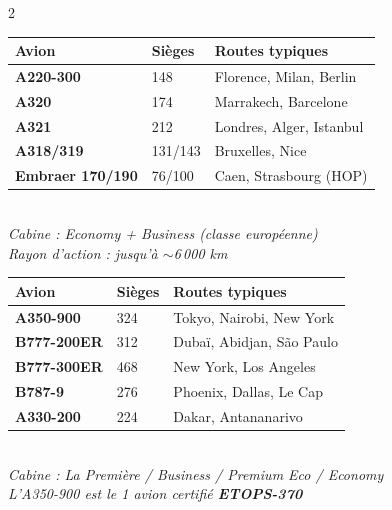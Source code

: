 \documentclass[9pt,a4paper,landscape]{article}
\begin{document}
\begin{multicols}{2}
\scriptsize

\begin{tcolorbox}[colback=eurlight,colframe=eurblue,title={\textbf{COURT \& MOYEN-COURRIER (Europe, Afrique N.)}},fonttitle=\bfseries\color{white}]
\begin{tabular}{lll}
\toprule
\textbf{Avion} & \textbf{Sièges} & \textbf{Routes typiques} \\
\midrule
\textbf{A220-300} & 148 & Florence, Milan, Berlin \\
\textbf{A320} & 174 & Marrakech, Barcelone \\
\textbf{A321} & 212 & Londres, Alger, Istanbul \\
\textbf{A318/319} & 131/143 & Bruxelles, Nice \\
\textbf{Embraer 170/190} & 76/100 & Caen, Strasbourg (HOP) \\
\bottomrule
\end{tabular}\\[0.1cm]
\textit{Cabine : Economy + Business (classe européenne)}\\
\textit{Rayon d'action : jusqu'à $\sim$6\,000 km}
\end{tcolorbox}

\begin{tcolorbox}[colback=asilight,colframe=asired,title={\textbf{LONG-COURRIER}},fonttitle=\bfseries\color{white}]
\begin{tabular}{lll}
\toprule
\textbf{Avion} & \textbf{Sièges} & \textbf{Routes typiques} \\
\midrule
\textbf{A350-900} & 324 & Tokyo, Nairobi, New York \\
\textbf{B777-200ER} & 312 & Dubaï, Abidjan, São Paulo \\
\textbf{B777-300ER} & 468 & New York, Los Angeles \\
\textbf{B787-9} & 276 & Phoenix, Dallas, Le Cap \\
\textbf{A330-200} & 224 & Dakar, Antananarivo \\
\bottomrule
\end{tabular}\\[0.1cm]
\textit{Cabine : La Première / Business / Premium Eco / Economy}\\
\textit{L'A350-900 est le 1 avion certifié \textbf{ETOPS-370}}
\end{tcolorbox}

\vspace{0.15cm}


\end{multicols}
\end{document}

